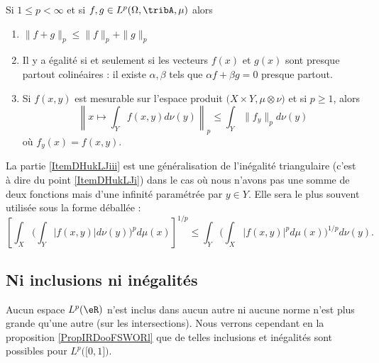 \begin{proposition}     \label{PropInegMinkKUpRHg}
    Si \( 1\leq p<\infty\) et si \( f,g\in L^p(\Omega,\tribA,\mu)\) alors
    \begin{enumerate}
        \item   \label{ItemDHukLJi}
            \( \| f+g \|_p\leq \| f \|_p+\| g \|_p\)
        \item
            Il y a égalité si et seulement si les vecteurs \( f(x)\) et \( g(x)\) sont presque partout colinéaires : il existe \( \alpha,\beta\) tels que \( \alpha f+\beta g=0\) presque partout.

        \item   \label{ItemDHukLJiii}

            Si \( f(x,y)\) est mesurable sur l'espace produit \( \big( X\times Y,\mu\otimes\nu \big)\) et si \( p\geq 1\), alors
            \begin{equation}
                \left\|   x\mapsto\int_Y f(x,y)d\nu(y)   \right\|_p\leq \int_Y  \| f_y \|_pd\nu(y)
            \end{equation}
            où \( f_y(x)=f(x,y)\).

    \end{enumerate}
\end{proposition}

La partie \ref{ItemDHukLJiii} est une généralisation de l'inégalité triangulaire (c'est à dire du point \ref{ItemDHukLJi}) dans le cas où nous n'avons pas une somme de deux fonctions mais d'une infinité paramétrée par \( y\in Y\). Elle sera le plus souvent utilisée sous la forme déballée :
\begin{equation}    \label{EqZSiTZrH}
    \left[ \int_X\Big( \int_Y| f(x,y) |d\nu(y) \Big)^pd\mu(x) \right]^{1/p}\leq \int_Y\Big( \int_X| f(x,y) |^pd\mu(x) \Big)^{1/p}d\nu(y).
\end{equation}

\subsection{Ni inclusions ni inégalités}

Aucun espace \( L^p(\eR)\) n'est inclus dans aucun autre ni aucune norme n'est plus grande qu'une autre (sur les intersections). Nous verrons cependant en la proposition \ref{PropIRDooFSWORl} que de telles inclusions et inégalités sont possibles pour \( L^p\big( \mathopen[ 0 , 1 \mathclose] \big)\).

